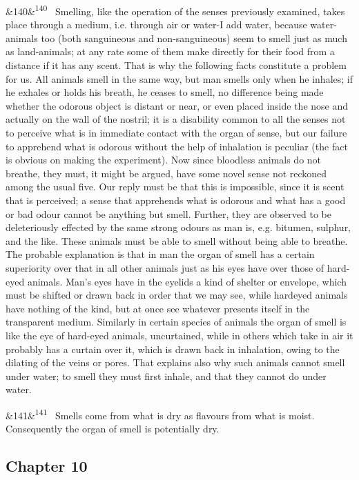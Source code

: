 \documentclass[12pt]{article}
\newcommand{\para}[1][]{\par\noindent\ifx&#1&\else\textsuperscript{\footnotesize #1}~\fi}
\begin{document}
\para[140] Smelling, like the operation of the senses previously examined, takes place through a medium, i.e. through air or water-I add water, because water-animals too (both sanguineous and non-sanguineous) seem to smell just as much as land-animals; at any rate some of them make directly for their food from a distance if it has any scent. That is why the following facts constitute a problem for us. All animals smell in the same way, but man smells only when he inhales; if he exhales or holds his breath, he ceases to smell, no difference being made whether the odorous object is distant or near, or even placed inside the nose and actually on the wall of the nostril; it is a disability common to all the senses not to perceive what is in immediate contact with the organ of sense, but our failure to apprehend what is odorous without the help of inhalation is peculiar (the fact is obvious on making the experiment). Now since bloodless animals do not breathe, they must, it might be argued, have some novel sense not reckoned among the usual five. Our reply must be that this is impossible, since it is scent that is perceived; a sense that apprehends what is odorous and what has a good or bad odour cannot be anything but smell. Further, they are observed to be deleteriously effected by the same strong odours as man is, e.g. bitumen, sulphur, and the like. These animals must be able to smell without being able to breathe. The probable explanation is that in man the organ of smell has a certain superiority over that in all other animals just as his eyes have over those of hard-eyed animals. Man's eyes have in the eyelids a kind of shelter or envelope, which must be shifted or drawn back in order that we may see, while hardeyed animals have nothing of the kind, but at once see whatever presents itself in the transparent medium. Similarly in certain species of animals the organ of smell is like the eye of hard-eyed animals, uncurtained, while in others which take in air it probably has a curtain over it, which is drawn back in inhalation, owing to the dilating of the veins or pores. That explains also why such animals cannot smell under water; to smell they must first inhale, and that they cannot do under water.

\para[141] Smells come from what is dry as flavours from what is moist. Consequently the organ of smell is potentially dry.

\subsection*{Chapter 10}
\end{document}

